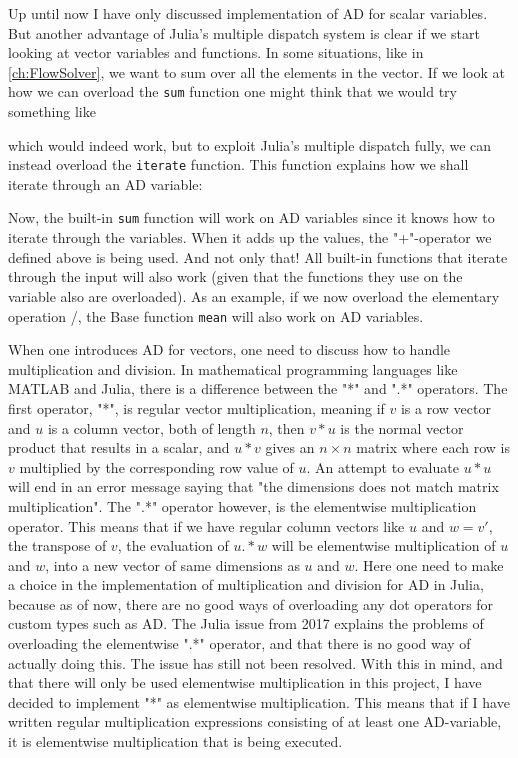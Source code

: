 Up until now I have only discussed implementation of AD for scalar variables. But another advantage of Julia's multiple dispatch system is clear if we start looking at vector variables and functions. In some situations, like in \autoref{ch:FlowSolver}, we want to sum over all the elements in the vector. If we look at how we can overload the \texttt{sum} function one might think that we would try something like

which would indeed work, but to exploit Julia's multiple dispatch fully, we can instead overload the \texttt{iterate} function. This function explains how we shall iterate through an AD variable: 

Now, the built-in \texttt{sum} function will work on AD variables since it knows how to iterate through the variables. When it adds up the values, the "+"-operator we defined above is being used. And not only that! All built-in functions that iterate through the input will also work (given that the functions they use on the variable also are overloaded). As an example, if we now overload the elementary operation /, the Base function \texttt{mean} will also work on AD variables.

When one introduces AD for vectors, one need to discuss how to handle multiplication and division. In mathematical programming languages like MATLAB and Julia, there is a difference between the "*" and ".*" operators. The first operator, "*", is regular vector multiplication, meaning if $v$ is a row vector and $u$ is a column vector, both of length $n$, then $v*u$ is the normal vector product that results in a scalar, and $u*v$ gives an $n\times n$ matrix where each row is $v$ multiplied by the corresponding row value of $u$. An attempt to evaluate $u*u$ will end in an error message saying that "the dimensions does not match matrix multiplication". The ".*" operator however, is the elementwise multiplication operator. This means that if we have regular column vectors like $u$ and $w = v'$, the transpose of $v$, the evaluation of $u.*w$ will be elementwise multiplication of $u$ and $w$, into a new vector of same dimensions as $u$ and $w$. Here one need to make a choice in the implementation of multiplication and division for AD in Julia, because as of now, there are no good ways of overloading any dot operators for custom types such as AD. The Julia issue \emph{\citep{JuliaIssueDot}} from 2017 explains the problems of overloading the elementwise ".*" operator, and that there is no good way of actually doing this. The issue has still not been resolved. With this in mind, and that there will only be used elementwise multiplication in this project, I have decided to implement "*" as elementwise multiplication. This means that if I have written regular multiplication expressions consisting of at least one AD-variable, it is elementwise multiplication that is being executed.

